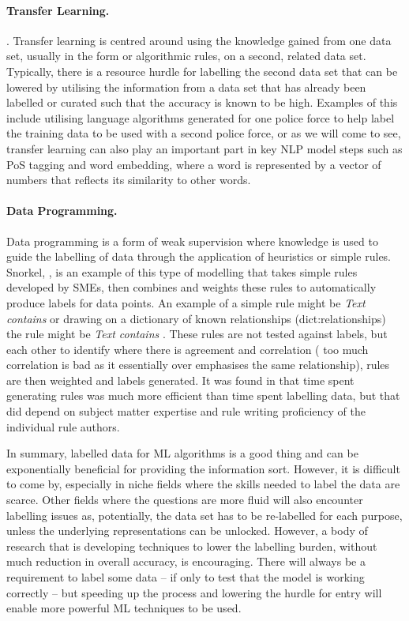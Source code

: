 \paragraph{Transfer Learning.}  \parencite{weiss2016survey,}. Transfer learning is centred around using the knowledge gained from one data set, usually in the form or algorithmic rules, on a second, related data set. Typically, there is a resource hurdle for labelling the second data set that can be lowered by utilising the information from a data set that has already been labelled or curated such that the accuracy is known to be high. Examples of this include utilising language algorithms generated for one police force to help label the training data to be used with a second police force, or as we will come to see, transfer learning can also play an important part in key NLP model steps such as PoS tagging and word embedding, where a word is represented by a vector of numbers that reflects its similarity to other words.


\paragraph{Data Programming.}  Data programming is a form of weak supervision where knowledge is used to guide the labelling of data through the application of heuristics or simple rules. Snorkel, \parencite{ratner2017snorkel}, is an example of this type of modelling that takes simple rules developed by SMEs, then combines and weights these rules to automatically produce labels for data points. An example of a simple rule might be \emph{Text contains } or drawing on a dictionary of known relationships (dict:relationships) the rule might be \emph{Text contains }. These rules are not tested against labels, but each other to identify where there is agreement and correlation ( too much correlation is bad as it essentially over emphasises the same relationship), rules are then weighted and labels generated. It was found in \textcite{ratner2017snorkel} that time spent generating rules was much more efficient than time spent labelling data, but that did depend on subject matter expertise and rule writing proficiency of the individual rule authors.


In summary, labelled data for ML algorithms is a good thing and can be exponentially beneficial for providing the information sort. However, it is difficult to come by, especially in niche fields where the skills needed to label the data are scarce. Other fields where the questions are more fluid will also encounter labelling issues as, potentially, the data set has to be re-labelled for each purpose, unless the underlying representations can be unlocked. However, a body of research that is developing techniques to lower the labelling burden, without much reduction in overall accuracy, is encouraging. There will always be a requirement to label some data – if only to test that the model is working correctly – but speeding up the process and lowering the hurdle for entry will enable more powerful ML techniques to be used.


